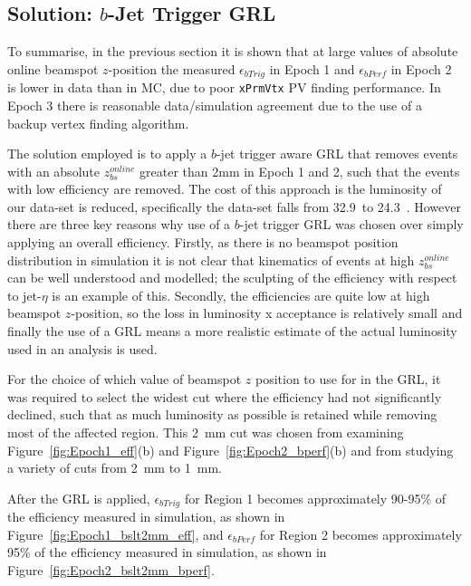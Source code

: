 \FloatBarrier

\subsection{Solution: $b$-Jet Trigger GRL}
\label{sec:trig-grl}

To summarise, in the previous section it is shown that at large values of absolute online beamspot $z$-position
the measured $\epsilon_{bTrig}$ in Epoch 1 and $\epsilon_{bPerf}$ in Epoch 2 is lower in data than in MC, due to poor \verb|xPrmVtx| PV finding performance.
In Epoch 3 there is reasonable data/simulation agreement due to the use of a backup vertex finding algorithm. 

The solution employed is to apply a $b$-jet trigger aware GRL 
that removes events with an absolute  $z_{bs}^{online}$ greater than 2mm in Epoch 1 and 2,
such that the events with low efficiency are removed.
The cost of this approach is the luminosity of our data-set is reduced, specifically the data-set falls from  32.9~\ifb to 24.3~\ifb.
However there are three key reasons why use of a $b$-jet trigger GRL was chosen over simply applying an overall efficiency.
Firstly, as there is no beamspot position distribution in simulation it is not clear that kinematics of events at high  $z_{bs}^{online}$ can be well understood and modelled;
the sculpting of the efficiency with respect to jet-$\eta$ is an example of this.
Secondly, the efficiencies are quite low at high beamspot $z$-position,
so the loss in luminosity x acceptance is relatively small
and finally the use of a GRL means a more realistic estimate of the actual luminosity used in an analysis is used. 

For the choice of which value of beamspot $z$ position to use for in the GRL,
it was required to select the widest cut where the efficiency had not significantly declined,
such that as much luminosity as possible is retained while removing most of the affected region.
This \SI{2}{\mm} cut was chosen from examining Figure~\ref{fig:Epoch1_eff}(b) and Figure~\ref{fig:Epoch2_bperf}(b)
and from studying a variety of cuts from \SI{2}{\mm} to \SI{1}{\mm}.

After the GRL is applied, $\epsilon_{bTrig}$ for Region 1 becomes approximately 90-95\% of the efficiency measured in simulation,
as shown in Figure~\ref{fig:Epoch1_bslt2mm_eff},
and $\epsilon_{bPerf}$ for Region 2 becomes approximately 95\% of the efficiency measured in simulation,
as shown in Figure~\ref{fig:Epoch2_bslt2mm_bperf}. 

